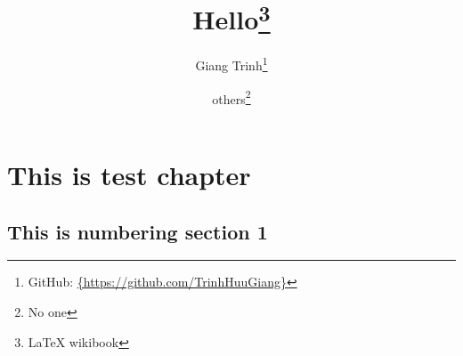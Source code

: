 \documentclass[12pt, a4paper, twoside]{report}
\begin{document}


\title{\textbf{Hello\thanks{\LaTeX {} wikibook}}}
\author{Giang Trinh\thanks{GitHub: \url{{https://github.com/TrinhHuuGiang}}}
    \and others\thanks{No one}}
\maketitle

\tableofcontents
\listoftables
\listoffigures


\chapter{This is test chapter}
\section{This is numbering section 1}
\end{document}
